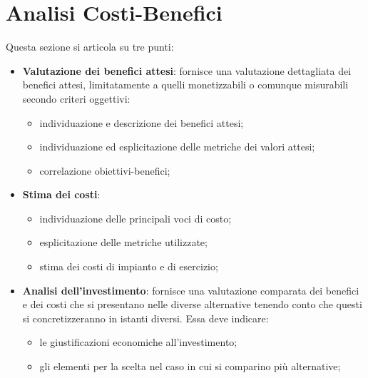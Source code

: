 \section{Analisi Costi-Benefici}\label{sec:ftt_analisi_costi_benefici} %
Questa sezione si articola su tre punti:
\begin{itemize}
    \item \textbf{Valutazione dei benefici attesi}: fornisce una valutazione dettagliata dei benefici attesi, limitatamente a quelli monetizzabili o comunque misurabili secondo criteri oggettivi:
        \begin{itemize}
            \item individuazione e descrizione dei benefici attesi;
            \item individuazione ed esplicitazione delle metriche dei valori attesi;
            \item correlazione obiettivi-benefici;
        \end{itemize}
    \item \textbf{Stima dei costi}:
        \begin{itemize}
            \item individuazione delle principali voci di costo;
            \item esplicitazione delle metriche utilizzate;
            \item stima dei costi di impianto e di esercizio;
        \end{itemize}
    \item \textbf{Analisi dell'investimento}: fornisce una valutazione comparata dei benefici e dei costi che si presentano nelle diverse alternative tenendo conto che questi si concretizzeranno in istanti diversi.
        Essa deve indicare:
        \begin{itemize}
            \item le giustificazioni economiche all'investimento;
            \item gli elementi per la scelta nel caso in cui si comparino più alternative;
        \end{itemize}
\end{itemize}
%
